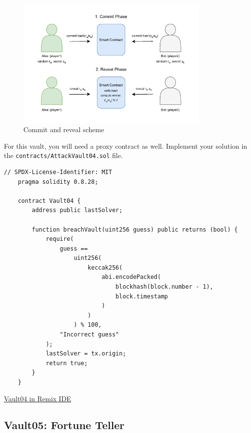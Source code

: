 \documentclass[12pt]{article}
\begin{document}
\begin{figure}[H]
    \centering
    \includegraphics[width=0.85\textwidth]{commit-reveal.pdf}
    \caption{Commit and reveal scheme}
    \label{fig:commit-reveal}
\end{figure}

\medskip
\noindent
For this vault, you will need a proxy contract as well. Implement your solution in the \texttt{contracts/AttackVault04.sol} file.

\begin{lstlisting}[language=Solidity]
    // SPDX-License-Identifier: MIT
    pragma solidity 0.8.28;
    
    contract Vault04 {
        address public lastSolver;
    
        function breachVault(uint256 guess) public returns (bool) {
            require(
                guess ==
                    uint256(
                        keccak256(
                            abi.encodePacked(
                                blockhash(block.number - 1),
                                block.timestamp
                            )
                        )
                    ) % 100,
                "Incorrect guess"
            );
            lastSolver = tx.origin;
            return true;
        }
    }
\end{lstlisting}

\medskip
\noindent
\href{https://remix.ethereum.org/?#activate=solidity&url=https://github.com/radovluk/unbreakable-vault/contracts/Vault04.sol&lang=en&optimize=false&runs=200&evmVersion=null&version=soljson-v0.8.28+commit.7893614a.js}{Vault04 in Remix IDE}

\subsection*{Vault05: Fortune Teller}
\end{document}
